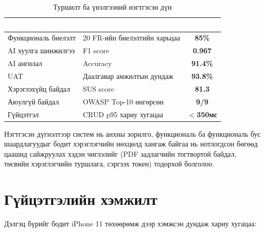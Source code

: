 \begin{table}[ht]
\centering
\footnotesize
\renewcommand{\arraystretch}{1.25}
\begin{tabular}{|p{4.5cm}|p{4.5cm}|c|}
\hline
\rowcolor{darknavy}
\textcolor{white}{\textbf{Туршилтын төрөл}} &
\textcolor{white}{\textbf{Гол үзүүлэлт}} &
\textcolor{white}{\textbf{Үр дүн}} \\ \hline
Функциональ биелэлт      & 20 FR-ийн биелэлтийн харьцаа        & \textbf{85\%} \\ \hline
AI хуулга шинжилгээ     & F1 score                            & \textbf{0.967} \\ \hline
AI ангилал              & Accuracy                            & \textbf{91.4\%} \\ \hline
UAT                     & Даалгавар амжилтын дундаж           & \textbf{93.8\%} \\ \hline
Хэрэглэхүйц байдал      & SUS score                           & \textbf{81.3} \\ \hline
Аюулгүй байдал          & OWASP Top-10 өнгөрсөн               & \textbf{9/9} \\ \hline
Гүйцэтгэл               & CRUD p95 хариу хугацаа              & \textbf{$<$350мс} \\ \hline
\end{tabular}
\caption{Туршилт ба үнэлгээний нэгтгэсэн дүн}
\label{tab:eval-summary}
\end{table}

Нэгтгэсэн дүгнэлтээр систем нь анхны зорилго, функциональ ба функциональ бус шаардлагуудыг бодит хэрэглэгчийн нөхцөлд хангаж байгаа нь нотлогдсон бөгөөд цаашид сайжруулах хэдэн чиглэлийг (PDF задлагчийн тогтвортой байдал, төсвийн хэрэглэгчийн туршлага, сэргээх токен) тодорхой болголоо.

\section{Гүйцэтгэлийн хэмжилт}
Дэлгэц бүрийг бодит iPhone 11 төхөөрөмж дээр хэмжсэн дундаж хариу хугацаа:

